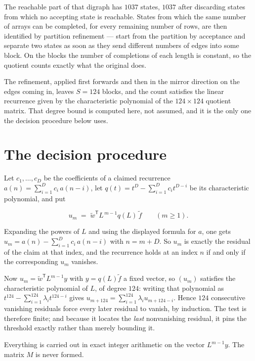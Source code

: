 \documentclass[11pt]{article}
\theoremstyle{definition}
\begin{document}
The reachable part of that digraph has $1037$ states, $1037$ after discarding states from which no accepting state is reachable. States from which the same number of arrays can be completed, for every remaining number of rows, are then identified by partition refinement --- start from the partition by acceptance and separate two states as soon as they send different numbers of edges into some block. On the blocks the number of completions of each length is constant, so the quotient counts exactly what the original does.

The refinement, applied first forwards and then in the mirror direction on the edges coming in, leaves $S = 124$ blocks, and the count satisfies the linear recurrence given by the characteristic polynomial of the $124 \times 124$ quotient matrix. That degree bound is computed here, not assumed, and it is the only one the decision procedure below uses.

\section{The decision procedure}

Let $c_1,\dots,c_D$ be the coefficients of a claimed recurrence $a(n) = \sum_{i=1}^{D} c_i\,a(n-i)$, let $q(t) = t^{D} - \sum_{i=1}^{D} c_i t^{D-i}$ be its characteristic polynomial, and put

\[u_m \;=\; \tilde w^{\mathsf T} L^{\,m-1} q(L)\,\tilde f \qquad (m \ge 1).\]

Expanding the powers of $L$ and using the displayed formula for $a$, one gets $u_m = a(n) - \sum_{i=1}^{D} c_i\,a(n-i)$ with $n = m + D$. So $u_m$ is exactly the residual of the claim at that index, and the recurrence holds at an index $n$ if and only if the corresponding $u_m$ vanishes.

Now $u_m = \tilde w^{\mathsf T} L^{m-1} y$ with $y = q(L)\tilde f$ a fixed vector, so $(u_m)$ satisfies the characteristic polynomial of $L$, of degree $124$: writing that polynomial as $t^{124} - \sum_{i=1}^{124} \lambda_i t^{124-i}$ gives $u_{m+124} = \sum_{i=1}^{124} \lambda_i u_{m+124-i}$. Hence $124$ consecutive vanishing residuals force every later residual to vanish, by induction. The test is therefore finite; and because it locates the {\itshape last} nonvanishing residual, it pins the threshold exactly rather than merely bounding it.

Everything is carried out in exact integer arithmetic on the vector $L^{m-1}y$. The matrix $M$ is never formed.
\end{document}
